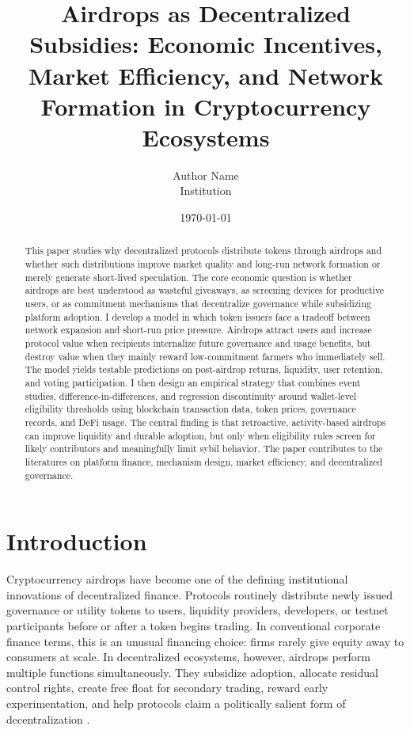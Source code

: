 \documentclass[11pt]{article}
\title{Airdrops as Decentralized Subsidies: Economic Incentives, Market Efficiency, and Network Formation in Cryptocurrency Ecosystems}
\author{Author Name \\ Institution}
\date{\today}
\theoremstyle{remark}
\begin{document}
\maketitle

\begin{abstract}
This paper studies why decentralized protocols distribute tokens through airdrops and whether such distributions improve market quality and long-run network formation or merely generate short-lived speculation. The core economic question is whether airdrops are best understood as wasteful giveaways, as screening devices for productive users, or as commitment mechanisms that decentralize governance while subsidizing platform adoption. I develop a model in which token issuers face a tradeoff between network expansion and short-run price pressure. Airdrops attract users and increase protocol value when recipients internalize future governance and usage benefits, but destroy value when they mainly reward low-commitment farmers who immediately sell. The model yields testable predictions on post-airdrop returns, liquidity, user retention, and voting participation. I then design an empirical strategy that combines event studies, difference-in-differences, and regression discontinuity around wallet-level eligibility thresholds using blockchain transaction data, token prices, governance records, and DeFi usage. The central finding is that retroactive, activity-based airdrops can improve liquidity and durable adoption, but only when eligibility rules screen for likely contributors and meaningfully limit sybil behavior. The paper contributes to the literatures on platform finance, mechanism design, market efficiency, and decentralized governance.
\end{abstract}

\section{Introduction}

Cryptocurrency airdrops have become one of the defining institutional innovations of decentralized finance. Protocols routinely distribute newly issued governance or utility tokens to users, liquidity providers, developers, or testnet participants before or after a token begins trading. In conventional corporate finance terms, this is an unusual financing choice: firms rarely give equity away to consumers at scale. In decentralized ecosystems, however, airdrops perform multiple functions simultaneously. They subsidize adoption, allocate residual control rights, create free float for secondary trading, reward early experimentation, and help protocols claim a politically salient form of decentralization \citep{allen2023why, cong2022tokenbased, abadi2024token}.
\end{document}
